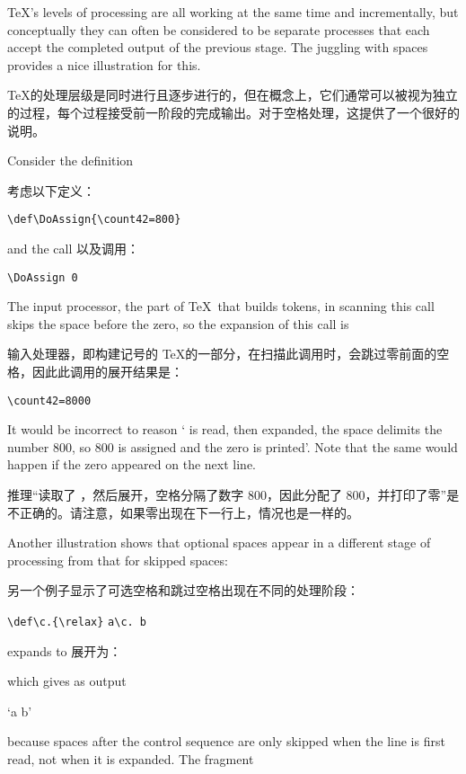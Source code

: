 \TeX's levels of processing are all working at the
\awp
same time and incrementally, but conceptually they can often be
considered to be separate processes that each accept the
completed output of the previous stage. The juggling with
spaces provides a nice illustration for this.

\TeX 的处理层级是同时进行且逐步进行的，但在概念上，它们通常可以被视为独立的过程，每个过程接受前一阶段的完成输出。对于空格处理，这提供了一个很好的说明。

Consider the definition

考虑以下定义：
\begin{verbatim}
\def\DoAssign{\count42=800}
\end{verbatim}
and the call 以及调用：
\begin{verbatim}
\DoAssign 0
\end{verbatim}
The input processor, the part
of \TeX\ that builds tokens, in scanning this call
skips the space before the zero, so the expansion of this
call is 

输入处理器，即构建记号的 \TeX 的一部分，在扫描此调用时，会跳过零前面的空格，因此此调用的展开结果是：
\begin{verbatim}
\count42=8000
\end{verbatim}
It would be incorrect to reason
` is read, then expanded, the space delimits the
number 800, so 800 is assigned and the zero is printed'.
Note that the same would happen if the zero appeared on the next line.

推理“读取了 ，然后展开，空格分隔了数字 800，因此分配了 800，并打印了零”是不正确的。请注意，如果零出现在下一行上，情况也是一样的。


Another illustration shows that optional spaces appear in a different
stage of processing from that for skipped spaces:

另一个例子显示了可选空格和跳过空格出现在不同的处理阶段：

\begin{disp}\verb>\def\c.{\relax}>\nl
     \verb>a\c.>{\tt{} b}\end{disp}
expands to 展开为：
\begin{disp}\end{disp}
which gives as output\begin{disp} `a b'\end{disp}
because spaces after the  control sequence are only
skipped when the line is first read, not when it is expanded.
The fragment

